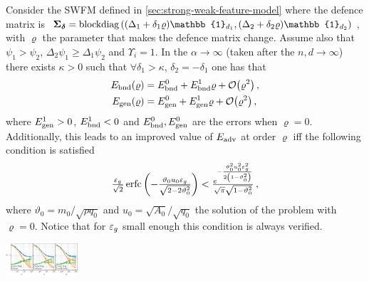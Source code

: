 \documentclass[a0paper,fleqn]{betterportraitposter}
\theoremstyle{plain}
\theoremstyle{definition}
\theoremstyle{remark}
\begin{document}
{\begin{multicols}{3}
Consider the SWFM defined in \cref{sec:strong-weak-feature-model}
where the defence matrix is 
\(
    \Sigmadelta = \operatorname{blockdiag}\qty( 
        (\Delta_1 + \delta_1 \varrho ) \mathbb{1}_{d_1}, (\Delta_2 + \delta_2 \varrho ) \mathbb{1}_{d_2} 
    )
\), 
with \(\varrho\) the parameter that makes the defence matrix change.
Assume also that \(\psi_1 > \psi_2\), \(\Delta_2 \psi_1 \geq \Delta_1 \psi_2\) and \(\Upsilon_i = 1\).
In the \(\alpha\to \infty\) (taken after the \(n,d\to\infty\)) there exists \(\kappa > 0\) such that \(\forall \delta_1 > \kappa\), \(\delta_2 = -\delta_1\) one has that
\begin{equation}
\begin{aligned}
    \bounderr(\varrho) &= \bounderr^0 + \bounderr^1 \varrho + \order{\varrho^2} \,, \\
    \generr(\varrho) &= \generr^0 + \generr^1 \varrho + \order{\varrho^2} \,,
\end{aligned}
\end{equation}
where \(E_{\mathrm{gen}}^1 > 0\), \(E_{\mathrm{bnd}}^1 < 0\) and \(E_{\mathrm{bnd}}^0,E_{\mathrm{gen}}^0\) are the errors when \(\varrho =0\).
Additionally, this leads to an improved value of \(E_{\mathrm{adv}}\) at order \(\varrho\) iff the following condition is satisfied
\vspace{-5pt}
\begin{equation}
    {\textstyle
        \frac{\ensuremath{\varepsilon_g}}{\sqrt{2}}
        \operatorname*{erfc}\qty( -\frac{\vartheta_0 u_0 \ensuremath{\varepsilon_g}}{ \sqrt{2-2 \vartheta_0 ^2} }) 
        < \frac{e^{-\frac{\vartheta_0^2 u_0^2 \ensuremath{\varepsilon_g}^2}{2 \left(1-\vartheta_0 ^2\right) } }}{\sqrt{\pi} \sqrt{1-\vartheta_0^2}} \,,
    }
\end{equation}
where \(\vartheta_0 = m_0 / \sqrt{\rho q_0}\) and \(u_0 = \sqrt{A_0} / \sqrt{q_0}\) the solution of the problem with \(\varrho = 0\). 
Notice that for \(\varepsilon_g\) small enough this condition is always verified.

\includegraphics[width=0.2\textwidth]{Assets/defence_sweep.pdf}



\end{multicols}}
\end{document}
